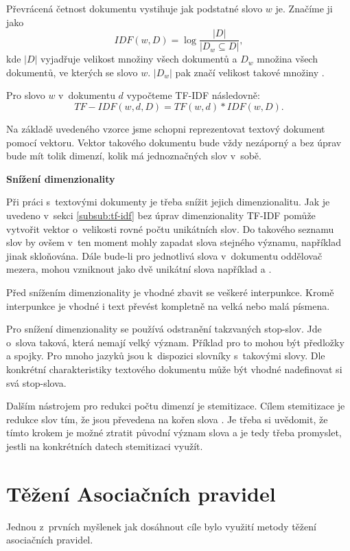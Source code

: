 \documentclass[thesis=M,czech]{FITthesis}[2012/10/20]
\begin{document}
\begin{itemize}
			Převrácená četnost dokumentu vystihuje jak podstatné slovo $w$ je. Značíme ji jako $$IDF(w,D) = \log{\frac{|D|}{|D_w \subseteq D|}},$$ kde $|D|$ vyjadřuje velikost množiny všech dokumentů a $D_w$ množina všech dokumentů, ve kterých se slovo $w$. $|D_w|$ pak značí velikost takové množiny \cite{RamosTF-IDF}.
			
			Pro slovo $w$ v~dokumentu $d$ vypočteme TF-IDF následovně:
			$$TF-IDF(w,d,D) = TF(w,d) * IDF(w,D).$$
			
			Na základě uvedeného vzorce jsme schopni reprezentovat textový dokument pomocí vektoru. Vektor takového dokumentu bude vždy nezáporný a bez úprav bude mít tolik dimenzí, kolik má jednoznačných slov v~sobě.
			
		\textbf{Snížení dimenzionality}
		
			Při práci s~textovými dokumenty je třeba snížit jejich dimenzionalitu. Jak je uvedeno v~sekci \ref{subsub:tf-idf} bez úprav dimenzionality TF-IDF pomůže vytvořit vektor o~velikosti rovné počtu unikátních slov. Do takového seznamu slov by ovšem v~ten moment mohly zapadat slova stejného významu, například jinak skloňována. Dále bude-li pro jednotlivá slova v~dokumentu oddělovač mezera, mohou vzniknout jako dvě unikátní slova například  a .
			
			Před snížením dimenzionality je vhodné zbavit se veškeré interpunkce. Kromě interpunkce je vhodné i text převést kompletně na velká nebo malá písmena.
						
			Pro snížení dimenzionality se používá odstranění takzvaných stop-slov. Jde o~slova taková, která nemají velký význam. Příklad pro to mohou být předložky a spojky. Pro mnoho jazyků jsou k~dispozici slovníky s~takovými slovy. Dle konkrétní charakteristiky textového dokumentu může být vhodné nadefinovat si svá stop-slova.
			
			Dalším nástrojem pro redukci počtu dimenzí je stemitizace. Cílem stemitizace je redukce slov tím, že jsou převedena na kořen slova \cite{textPreprop}. Je třeba si uvědomit, že tímto krokem je možné ztratit původní význam slova a je tedy třeba promyslet,  jestli na konkrétních datech stemitizaci využít.		
	\end{itemize}
		
		
	\section{Těžení Asociačních pravidel}
		Jednou z~prvních myšlenek jak dosáhnout cíle bylo využití metody těžení asociačních pravidel. 
		
\end{document}
